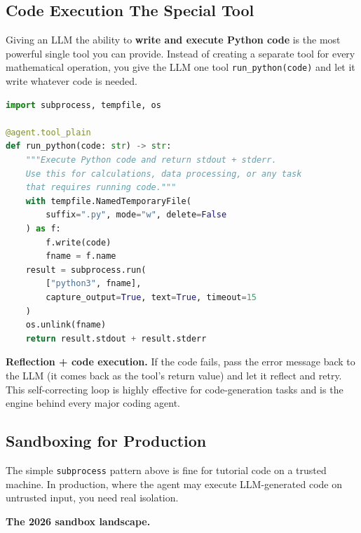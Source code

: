 \documentclass[a4paper,11pt]{article}
\begin{document}
\subsection{Code Execution \textemdash{} The Special Tool}

Giving an LLM the ability to \textbf{write and execute Python code} is
the most powerful single tool you can provide. Instead of creating a
separate tool for every mathematical operation, you give the LLM one
tool \textemdash{} \texttt{run\_python(code)} \textemdash{} and let
it write whatever code is needed.

\begin{lstlisting}[language=Python]
import subprocess, tempfile, os

@agent.tool_plain
def run_python(code: str) -> str:
    """Execute Python code and return stdout + stderr.
    Use this for calculations, data processing, or any task
    that requires running code."""
    with tempfile.NamedTemporaryFile(
        suffix=".py", mode="w", delete=False
    ) as f:
        f.write(code)
        fname = f.name
    result = subprocess.run(
        ["python3", fname],
        capture_output=True, text=True, timeout=15
    )
    os.unlink(fname)
    return result.stdout + result.stderr
\end{lstlisting}

\textbf{Reflection + code execution.}
If the code fails, pass the error message back to the LLM (it comes
back as the tool's return value) and let it reflect and retry. This
self-correcting loop is highly effective for code-generation tasks
and is the engine behind every major coding agent.

\subsection{Sandboxing for Production}

The simple \texttt{subprocess} pattern above is fine for tutorial code
on a trusted machine. In production, where the agent may execute
LLM-generated code on untrusted input, you need real isolation.

\textbf{The 2026 sandbox landscape.}
\end{document}
